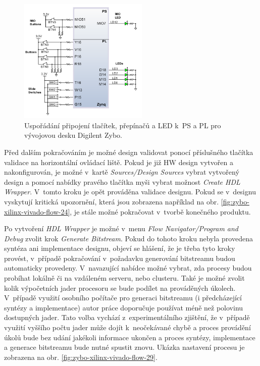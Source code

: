 \documentclass[a4paper, twoside, 11pt]{article}
\begin{document}
\begin{appendices}
		\begin{figure}[htbp!]
			\centering
			\includegraphics[width=0.55\textwidth]{src/png/digilent-zybo-ps-pl-gpio.png}
			\caption{Uspořádání připojení tlačítek, přepínačů a LED k~PS a PL pro vývojovou desku Digilent Zybo. \cite{digilent-zybo-reference-manual}}
			\label{fig:digilent-zybo-ps-pl-gpio}
		\end{figure}


		Před dalším pokračováním je možné design validovat ponocí příslušného tlačítka validace na horizontální ovládací liště. Pokud je již HW design vytvořen a nakonfigurován, je možné v~kartě \textit{Sources/Design Sources} vybrat vytvořený design a pomocí nabídky pravého tlačítka myši vybrat možnost \textit{Create HDL Wrapper}. V~tomto kroku je opět prováděna validace designu. Pokud se v~designu vyskytují kritická upozornění, která jsou zobrazena například na obr. \ref{fig:zybo-xilinx-vivado-flow-24}, je stále možné pokračovat v~tvorbě konečného produktu.\par
		Po vytvoření \textit{HDL Wrapper} je možné v~menu \textit{Flow Navigator/Program and Debug} zvolit krok \textit{Generate Bitstream}. Pokud do tohoto kroku nebyla provedena syntéza ani implementace designu, objeví se hlášení, že je třeba tyto kroky provést, v~případě pokračování v~požadavku generování bitstreamu budou automaticky provedeny. V~navazující nabídce možné vybrat, zda procesy budou probíhat lokálně či na vzdáleném serveru, nebo clusteru. Také je možné zvolit kolik výpočetních jader procesoru se bude podílet na prováděných úkolech. V~případě využití osobního počítače pro generaci bitstreamu (i předcházející syntézy a implementace) autor práce doporučuje používat méně než polovinu dostupných jader. Tato volba vychází z~experimentálního zjištění, že v~případě využití vyššího počtu jader může dojít k~neočekávané chybě a proces provádění úkolů bude bez udání jakékoli informace ukončen a proces syntézy, implementace a generace bitstreamu bude nutné spustit znovu. Ukázka nastavení procesu je zobrazena na obr. \ref{fig:zybo-xilinx-vivado-flow-29}.\par



\end{appendices}
\end{document}
